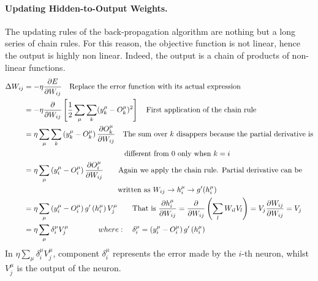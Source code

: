 \paragraph*{Updating Hidden-to-Output Weights.} The updating rules of the back-propagation algorithm are nothing but a long series of chain rules. For this reason, the objective function is not linear, hence the output is highly non linear. Indeed, the output is a chain of products of non-linear functions.\\
\begin{equation} \notag
\begin{split}
\Delta W_{ij} &= -\eta \frac{\partial E}{\partial W_{ij}} \quad \text{Replace the error function with its actual expression}\\
&= -\eta \frac{\partial}{\partial W_{ij}} \left[\frac{1}{2} \sum_{\mu} \sum_k (y_k^\mu - O_k^\mu)^2\right] \quad \text{First application of the chain rule}\\
&= \eta \sum _{\mu} \sum_{k} \left(y_{k}^{\mu} - O_{k}^{\mu} \right) \frac{\partial O_{k}^{\mu}} {\partial W_{ij}} \quad \text{The sum over } k \text{ disappers because the partial derivative is}\\
& \hspace*{13.5em} \text{different from 0 only when }k=i \\
&= \eta \sum_{\mu} \left(y_{i}^{\mu} - O_{i}^{\mu} \right) \frac{\partial O_{i}^{\mu}} {\partial W_{ij}} \qquad \text{Again we apply the chain rule. Partial derivative can be}\\
& \hspace*{12.6em} \text{written as } W_{ij} \rightarrow h_i^\mu \rightarrow g'(h_i^\mu)\\
&= \eta \sum _ { \mu } \left( y _ { i } ^ { \mu } - O _ { i } ^ { \mu } \right) g ^ { \prime } \left( h _ { i } ^ { \mu } \right) V _ { j } ^ { \mu } \qquad \text{That is } \frac{\partial h_i^\mu}{\partial W_{ij}} = \frac{\partial}{\partial W_{ij}}\left(\sum_l W_{il} V_l \right) = V_j \frac{\partial W_{ij}}{\partial W_{ij}} = V_j\\
&= \eta \sum _ { \mu } \delta _ { i } ^ { \mu } V _ { j } ^ { \mu } \qquad \qquad where: \quad \delta _ { i } ^ { \mu } = \left( y _ { i } ^ { \mu } - O _ { i } ^ { \mu } \right) g ^ { \prime } \left( h _ { i } ^ { \mu } \right)
\end{split}	
\end{equation}
In $\eta \sum_{\mu} \delta_{i}^{\mu} V_{j}^{\mu}$, component $\delta_{i}^{\mu}$ represents the error made by the $i$-th neuron, whilst $V_{j}^{\mu}$ is the output of the neuron.  

